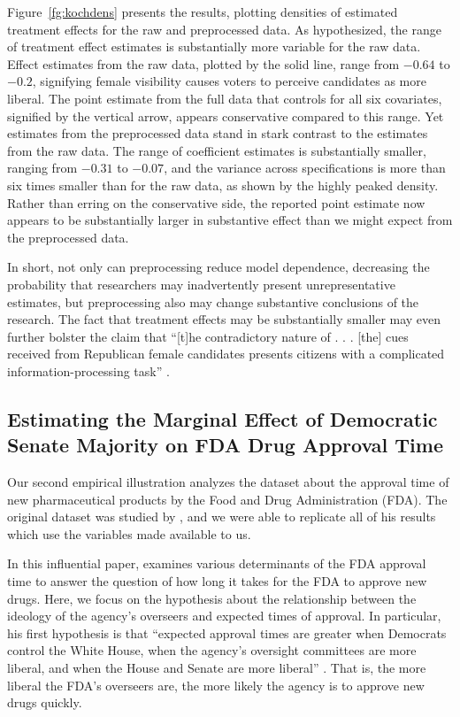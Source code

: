 \documentclass[11pt,titlepage]{article}
\begin{document}
Figure~\ref{fg:kochdens} presents the results, plotting densities of
estimated treatment effects for the raw and preprocessed data.  As
hypothesized, the range of treatment effect estimates is substantially
more variable for the raw data.  Effect estimates from the raw data, plotted by the
solid line, range from $-0.64$ to $-0.2$, signifying female visibility
causes voters to perceive candidates as more liberal.  The point
estimate from the full data that controls for all six covariates,
signified by the vertical arrow, appears conservative compared to this
range.  Yet estimates from the preprocessed data stand in stark
contrast to the estimates from the raw data.  The range of coefficient
estimates is substantially smaller, ranging from $-0.31$ to $-0.07$,
and the variance across specifications is more than six times smaller
than for the raw data, as shown by the highly peaked density.  Rather
than erring on the conservative side, the reported point estimate now
appears to be substantially larger in substantive effect than we might
expect from the preprocessed data.

In short, not only can preprocessing reduce model dependence,
decreasing the probability that researchers may inadvertently present
unrepresentative estimates, but preprocessing also may change
substantive conclusions of the research.  The fact that treatment
effects may be substantially smaller may even further bolster the
claim that ``[t]he contradictory nature of . . . [the] cues received
from Republican female candidates presents citizens with a complicated
information-processing task'' \citep[p. 460]{Koch02}.

\subsection{Estimating the Marginal Effect of Democratic Senate
  Majority on FDA Drug Approval Time} 

Our second empirical illustration analyzes the dataset about the
approval time of new pharmaceutical products by the Food and Drug
Administration (FDA). The original dataset was studied by
\citet{Carp02}, and we were able to replicate all of his results which
use the variables made available to us.

In this influential paper, \citet{Carp02} examines various
determinants of the FDA approval time to answer the question of how
long it takes for the FDA to approve new drugs. Here, we focus on the
hypothesis about the relationship between the ideology of the agency's
overseers and expected times of approval. In particular, his first
hypothesis is that ``expected approval times are greater when
Democrats control the White House, when the agency's oversight
committees are more liberal, and when the House and Senate are more
liberal'' \citep[p.495]{Carp02}. That is, the more liberal the FDA's
overseers are, the more likely the agency is to approve new drugs
quickly. 
\end{document}
